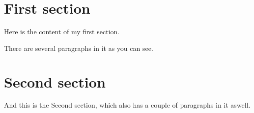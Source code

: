 \documentclass[12pt, a4paper, oneside, openright]{article}
\begin{document}
\section{First section}

Here is the content of my first section.

There are several paragraphs in it as you can see.

\section{Second section}

And this is the Second section, which also has a couple of paragraphs in it aswell.
\end{document}
